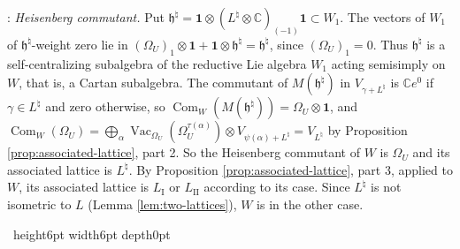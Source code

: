 \documentclass[leqno]{article}
\newcommand{\Cbb}{\ensuremath{\mathbb{C}}}
\newcommand{\qed}{\hfill \vrule height6pt  width6pt depth0pt}
\newcommand{\ot}{\otimes}
\newenvironment{proof}[1][]{\noindent {\it Proof #1} : }{\hbox{~}\qed
\smallskip
}
\numberwithin{equation}{section}
\begin{document}
\begin{proof}
\emph{Heisenberg commutant.} Put $\mathfrak h^\natural = \mathbf 1 \ot (L^\natural \ot \Cbb)_{(-1)}\mathbf 1 \subset W_1$. The vectors of $W_1$ of $\mathfrak h^\natural$-weight zero lie in $(\Omega_U)_1 \ot \mathbf 1+\mathbf 1 \ot \mathfrak h^\natural = \mathfrak h^\natural$, since $(\Omega_U)_1 = 0$. Thus $\mathfrak h^\natural$ is a self-centralizing subalgebra of the reductive Lie algebra $W_1$ \cite{DoM04} acting semisimply on $W$, that is, a Cartan subalgebra. The commutant of $M(\mathfrak h^\natural)$ in $V_{\gamma+L^\natural}$ is $\Cbb e^0$ if $\gamma \in L^\natural$ and zero otherwise, so $\operatorname{Com}_W(M(\mathfrak h^\natural)) = \Omega_U \ot \mathbf 1$, and $\operatorname{Com}_W(\Omega_U) = \bigoplus_\alpha \operatorname{Vac}_{\Omega_U}(\Omega_U^{\tau(\alpha)}) \ot V_{\psi(\alpha)+L^\natural} = V_{L^\natural}$ by Proposition \ref{prop:associated-lattice}, part 2. So the Heisenberg commutant of $W$ is $\Omega_U$ and its associated lattice is $L^\natural$. By Proposition \ref{prop:associated-lattice}, part 3, applied to $W$, its associated lattice is $L_{\mathrm I}$ or $L_{\mathrm{II}}$ according to its case. Since $L^\natural$ is not isometric to $L$ (Lemma \ref{lem:two-lattices}), $W$ is in the other case.


\end{proof}
\end{document}

